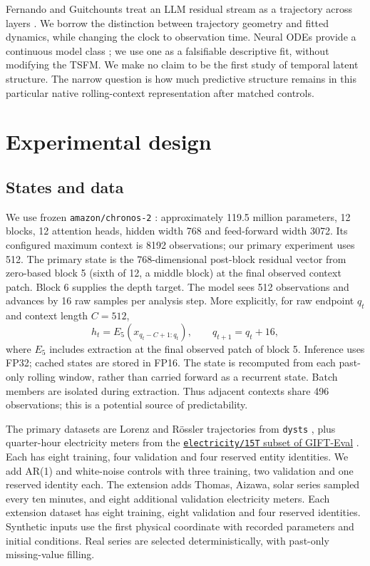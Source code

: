 \documentclass[10pt,a4paper,twocolumn]{article}
\begin{document}
Fernando and Guitchounts treat an LLM residual stream as a trajectory across layers \citep{fernando}.
We borrow the distinction between trajectory geometry and fitted dynamics, while changing the clock to observation time.
Neural ODEs provide a continuous model class \citep{chen}; we use one as a falsifiable descriptive fit, without modifying the TSFM.
We make no claim to be the first study of temporal latent structure.
The narrow question is how much predictive structure remains in this particular native rolling-context representation after matched controls.

\section{Experimental design}
\subsection{States and data}
We use frozen \texttt{amazon/chronos-2} \citep{chronos2}: approximately 119.5 million parameters, 12 blocks, 12 attention heads, hidden width 768 and feed-forward width 3072.
Its configured maximum context is 8192 observations; our primary experiment uses 512.
The primary state is the 768-dimensional post-block residual vector from zero-based block 5 (sixth of 12, a middle block) at the final observed context patch.
Block 6 supplies the depth target.
The model sees 512 observations and advances by 16 raw samples per analysis step.
More explicitly, for raw endpoint $q_t$ and context length $C=512$,
\begin{equation}
 h_t=E_5(x_{q_t-C+1:q_t}),\qquad q_{t+1}=q_t+16,
\end{equation}
where $E_5$ includes extraction at the final observed patch of block 5.
Inference uses FP32; cached states are stored in FP16.
The state is recomputed from each past-only rolling window, rather than carried forward as a recurrent state.
Batch members are isolated during extraction.
Thus adjacent contexts share 496 observations; this is a potential source of predictability.

The primary datasets are Lorenz and R\"ossler trajectories from \texttt{dysts} \citep{gilpin}, plus quarter-hour electricity meters from the \href{https://huggingface.co/datasets/Salesforce/GiftEval/tree/main/electricity/15T}{\texttt{electricity/15T} subset of GIFT-Eval} \citep{gift}.
Each has eight training, four validation and four reserved entity identities.
We add AR(1) and white-noise controls with three training, two validation and one reserved identity each.
The extension adds Thomas, Aizawa, solar series sampled every ten minutes, and eight additional validation electricity meters.
Each extension dataset has eight training, eight validation and four reserved identities.
Synthetic inputs use the first physical coordinate with recorded parameters and initial conditions.
Real series are selected deterministically, with past-only missing-value filling.
\end{document}
